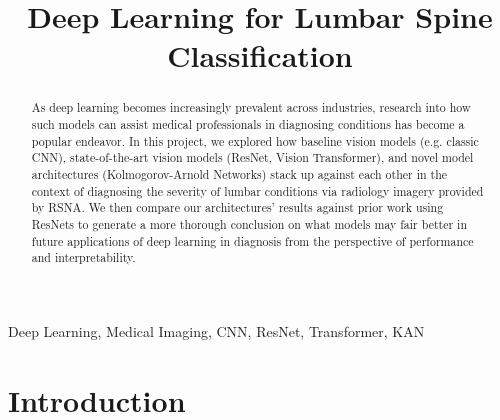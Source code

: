 \documentclass[conference]{IEEEtran}
\begin{document}
\title{Deep Learning for Lumbar Spine Classification}

\author{
\and
{}
\and
{}
}

\maketitle


\begin{abstract}
As deep learning becomes increasingly prevalent across industries, research into how such models can assist medical professionals in diagnosing conditions has become a popular endeavor. In this project, we explored how baseline vision models (e.g. classic CNN), state-of-the-art vision models (ResNet, Vision Transformer), and novel model architectures (Kolmogorov-Arnold Networks) stack up against each other in the context of diagnosing the severity of lumbar conditions via radiology imagery provided by RSNA. We then compare our architectures' results against prior work using ResNets to generate a more thorough conclusion on what models may fair better in future applications of deep learning in diagnosis from the perspective of performance and interpretability.
\end{abstract}

\begin{IEEEkeywords}
Deep Learning, Medical Imaging, CNN, ResNet, Transformer, KAN
\end{IEEEkeywords}


\section{Introduction}
\end{document}
